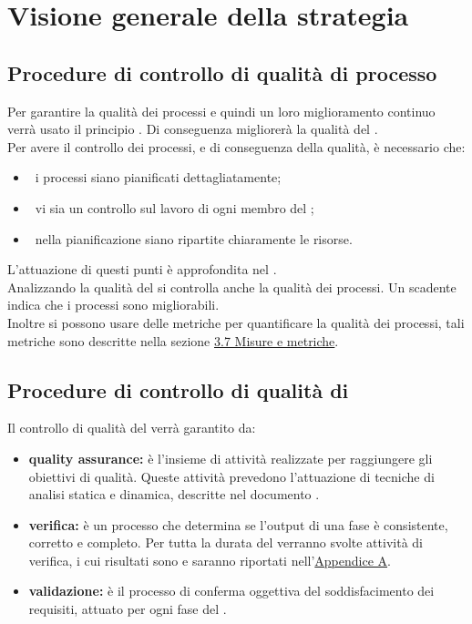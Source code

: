 
\section{Visione generale della strategia}
	\subsection{Procedure di controllo di qualità di processo}
		Per garantire la qualità dei processi e quindi un loro miglioramento continuo verrà usato il principio . Di conseguenza migliorerà la qualità del . \\
		Per avere il controllo dei processi, e di conseguenza della qualità, è necessario che:
		\begin{itemize}
			\item\ i processi siano pianificati dettagliatamente;
			\item\ vi sia un controllo sul lavoro di ogni membro del ;
			\item\ nella pianificazione siano ripartite chiaramente le risorse.
		\end{itemize}
		L'attuazione di questi punti è approfondita nel \PPdoc. \\
		Analizzando la qualità del  si controlla anche la qualità dei processi. Un  scadente indica che i processi sono migliorabili. \\
		Inoltre si possono usare delle metriche per quantificare la qualità dei processi, tali metriche sono descritte nella sezione \hyperref[sec:3.7]{3.7 Misure e metriche}.
	\subsection{Procedure di controllo di qualità di }
		Il controllo di qualità del  verrà garantito da:
		\begin{itemize}
			\item \textbf{quality assurance:} è l'insieme di attività realizzate per raggiungere gli obiettivi di qualità. Queste attività prevedono l'attuazione di tecniche di analisi statica e dinamica, descritte nel documento \NPdoc.
			\item \textbf{verifica:} è un processo che determina se l'output di una fase è consistente, corretto e completo. Per tutta la durata del  verranno svolte attività di verifica, i cui risultati sono e saranno riportati nell'\hyperref[sec:A]{Appendice A}.
			\item \textbf{validazione:} è il processo di conferma oggettiva del soddisfacimento dei requisiti, attuato per ogni fase del .
		\end{itemize}
